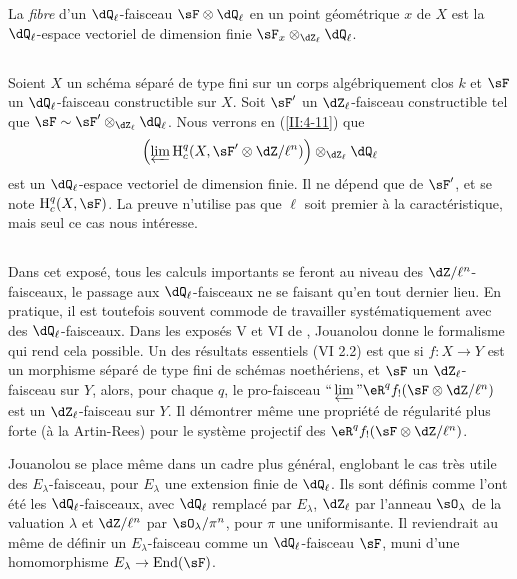 La \emph{fibre} d'un $\dQ_\ell$-faisceau $\sF\otimes\dQ_\ell$ en un point 
géométrique $x$ de $X$ est la $\dQ_\ell$-espace vectoriel de dimension 
finie $\sF_x\otimes_{\dZ_\ell}\dQ_\ell$. 





\subsection{}\label{II:2-10}

Soient $X$ un schéma séparé de type fini sur un corps algébriquement 
clos $k$ et $\sF$ un $\dQ_\ell$-faisceau constructible sur $X$. Soit $\sF'$ un 
$\dZ_\ell$-faisceau constructible tel que 
$\sF\sim \sF'\otimes_{\dZ_\ell}\dQ_\ell$. Nous verrons en (\ref{II:4-11}) que 
\[
  \left(\varprojlim \h_c^q(X,\sF'\otimes \dZ/\ell^n)\right)\otimes_{\dZ_\ell}\dQ_\ell
\]
est un $\dQ_\ell$-espace vectoriel de dimension finie. Il ne dépend que de 
$\sF'$, et se note $\h_c^q(X,\sF)$. La preuve n'utilise pas que $\ell$ soit 
premier à la caractéristique, mais seul ce cas nous intéresse. 





\subsection{}\label{II:2-11}

Dans cet exposé, tous les calculs importants se feront au niveau des 
$\dZ/\ell^n$-faisceaux, le passage aux $\dQ_\ell$-faisceaux ne se faisant qu'en 
tout dernier lieu. En pratique, il est toutefois souvent commode de travailler 
systématiquement avec des $\dQ_\ell$-faisceaux. Dans les exposés 
V et VI de \cite{sga5}, Jouanolou donne le formalisme qui rend cela possible. 
Un des résultats essentiels (VI 2.2) est que si $f:X\to Y$ est un morphisme 
séparé de type fini de schémas noethériens, et $\sF$ un 
$\dZ_\ell$-faisceau sur $Y$, alors, pour chaque $q$, le pro-faisceau 
$\text{``}\varprojlim\text{''}\eR^q f_! (\sF\otimes\dZ/\ell^n)$ est un 
$\dZ_\ell$-faisceau sur $Y$. Il démontrer même une propriété de 
régularité plus forte (à la Artin-Rees) pour le système projectif des 
$\eR^q f_!(\sF\otimes\dZ/\ell^n)$. 

Jouanolou se place même dans un cadre plus général, englobant le cas 
très utile des $E_\lambda$-faisceau, pour $E_\lambda$ une extension finie de 
$\dQ_\ell$. Ils sont définis comme l'ont été les $\dQ_\ell$-faisceaux, 
avec $\dQ_\ell$ remplacé par $E_\lambda$, $\dZ_\ell$ par l'anneau 
$\sO_\lambda$ de la valuation $\lambda$ et $\dZ/\ell^n$ par 
$\sO_\lambda/\pi^n$, pour $\pi$ une uniformisante. Il reviendrait au même de 
définir un $E_\lambda$-faisceau comme un $\dQ_\ell$-faisceau $\sF$, muni 
d'une homomorphisme $E_\lambda\to\operatorname{End}(\sF)$. 










